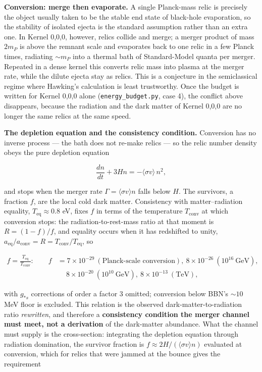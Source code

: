 \documentclass[
  11pt,
]{article}
\begin{document}
\textbf{Conversion: merge then evaporate.} A single Planck-mass relic is
precisely the object usually taken to be the stable end state of
black-hole evaporation, so the stability of isolated ejecta is the
standard assumption rather than an extra one. In Kernel 0,0,0, however,
relics collide and merge; a merger product of mass \(2m_P\) is above the
remnant scale and evaporates back to one relic in a few Planck times,
radiating \(\sim\!m_P\) into a thermal bath of Standard-Model quanta per
merger. Repeated in a dense kernel this converts relic mass into plasma
at the merger rate, while the dilute ejecta stay as relics. This is a
conjecture in the semiclassical regime where Hawking's calculation is
least trustworthy. Once the budget is written for Kernel 0,0,0 alone
(\texttt{energy\_budget.py}, case 4), the conflict above disappears,
because the radiation and the dark matter of Kernel 0,0,0 are no longer
the same relics at the same speed.

\textbf{The depletion equation and the consistency condition.}
Conversion has no inverse process --- the bath does not re-make relics
--- so the relic number density obeys the pure depletion equation

\[\frac{dn}{dt} + 3Hn = -\langle\sigma v\rangle\, n^2,\]

and stops when the merger rate \(\Gamma = \langle\sigma v\rangle n\)
falls below \(H\). The survivors, a fraction \(f\), are the local cold
dark matter. Consistency with matter--radiation equality,
\(T_{\text{eq}} \approx 0.8\) eV, fixes \(f\) in terms of the
temperature \(T_{\text{conv}}\) at which conversion stops: the
radiation-to-rest-mass ratio at that moment is \(R = (1-f)/f\), and
equality occurs when it has redshifted to unity,
\(a_{\text{eq}}/a_{\text{conv}} = R = T_{\text{conv}}/T_{\text{eq}}\),
so

\[\begin{aligned} f = \frac{T_{\text{eq}}}{T_{\text{conv}}}: \qquad f &= 7\times10^{-29}\ (\text{Planck-scale conversion}),\ 8\times10^{-26}\ (10^{16}\ \text{GeV}),\\ &\quad\ 8\times10^{-20}\ (10^{10}\ \text{GeV}),\ 8\times10^{-13}\ (\text{TeV}),\end{aligned}\]

with \(g_{*s}\) corrections of order a factor \(3\) omitted; conversion
below BBN's \(\sim\!10\) MeV floor is excluded. This relation is the
observed dark-matter-to-radiation ratio \emph{rewritten}, and therefore
a \textbf{consistency condition the merger channel must meet, not a
derivation} of the dark-matter abundance. What the channel must supply
is the cross-section: integrating the depletion equation through
radiation domination, the survivor fraction is
\(f \approx 2H/(\langle\sigma v\rangle n)\) evaluated at conversion,
which for relics that were jammed at the bounce gives the requirement
\end{document}
